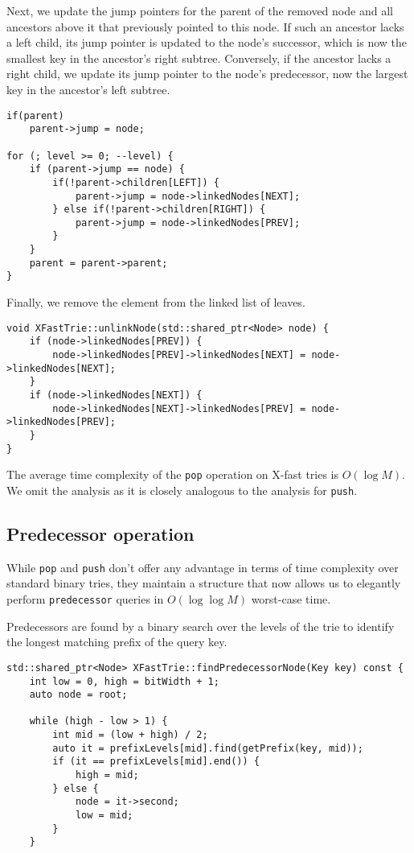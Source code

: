 Next, we update the jump pointers for the parent of the removed node and all ancestors above it that previously pointed to this node. If such an ancestor lacks a left child, its jump pointer is updated to the node’s successor, which is now the smallest key in the ancestor’s right subtree. Conversely, if the ancestor lacks a right child, we update its jump pointer to the node’s predecessor, now the largest key in the ancestor’s left subtree.

\begin{verbatim}
if(parent)
    parent->jump = node;

for (; level >= 0; --level) {
    if (parent->jump == node) {
        if(!parent->children[LEFT]) {
            parent->jump = node->linkedNodes[NEXT];
        } else if(!parent->children[RIGHT]) {
            parent->jump = node->linkedNodes[PREV];
        }
    }
    parent = parent->parent;
}
\end{verbatim}

Finally, we remove the element from the linked list of leaves.

\begin{verbatim}
void XFastTrie::unlinkNode(std::shared_ptr<Node> node) {
    if (node->linkedNodes[PREV]) {
        node->linkedNodes[PREV]->linkedNodes[NEXT] = node->linkedNodes[NEXT];
    }
    if (node->linkedNodes[NEXT]) {
        node->linkedNodes[NEXT]->linkedNodes[PREV] = node->linkedNodes[PREV];
    }
}
\end{verbatim}

The average time complexity of the \texttt{pop} operation on X-fast tries is \( O(\log M) \). We omit the analysis as it is closely analogous to the analysis for \texttt{push}.

\subsection{Predecessor operation}

While \texttt{pop} and \texttt{push} don't offer any advantage in terms of time complexity over standard binary tries, they maintain a structure that now allows us to elegantly perform \texttt{predecessor} queries in \( O(\log \log M) \) worst-case time.

Predecessors are found by a binary search over the levels of the trie to identify the longest matching prefix of the query key.

\begin{verbatim}
std::shared_ptr<Node> XFastTrie::findPredecessorNode(Key key) const {
    int low = 0, high = bitWidth + 1;
    auto node = root;

    while (high - low > 1) {
        int mid = (low + high) / 2;
        auto it = prefixLevels[mid].find(getPrefix(key, mid));
        if (it == prefixLevels[mid].end()) {
            high = mid;
        } else {
            node = it->second;
            low = mid;
        }
    }
\end{verbatim}

